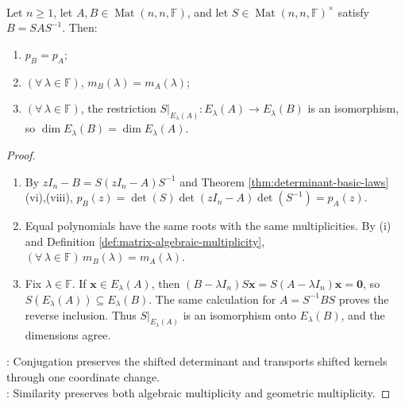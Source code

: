 \begin{theorem} \label{thm:similarity-preserves-characteristic-polynomial} \\
Let $n\geq1$, let $A,B\in\operatorname{Mat}(n,n,\mathbb{F})$, and let $S\in\operatorname{Mat}(n,n,\mathbb{F})^{\times}$ satisfy $B=SAS^{-1}$. Then:
\begin{enumerate}[label=(\roman*)]
\setlength{\itemsep}{0pt}
\item $p_B=p_A$;
\item $(\forall\,\lambda\in\mathbb{F})$, $m_B(\lambda)=m_A(\lambda)$;
\item $(\forall\,\lambda\in\mathbb{F})$, the restriction $S|_{E_{\lambda}(A)}:E_{\lambda}(A)\to E_{\lambda}(B)$ is an isomorphism, so $\dim E_{\lambda}(B)=\dim E_{\lambda}(A)$.
\end{enumerate}
\begin{proof}
\begin{enumerate}[label=(\roman*)]
\setlength{\itemsep}{0pt}
\item By $zI_n-B=S(zI_n-A)S^{-1}$ and Theorem \ref{thm:determinant-basic-laws}(vi),(viii), $p_B(z)=\det(S)\det(zI_n-A)\det(S^{-1})=p_A(z)$.
\item Equal polynomials have the same roots with the same multiplicities. By (i) and Definition \ref{def:matrix-algebraic-multiplicity}, $(\forall\,\lambda\in\mathbb{F})\,m_B(\lambda)=m_A(\lambda)$.
\item Fix $\lambda\in\mathbb{F}$. If $\mathbf{x}\in E_{\lambda}(A)$, then $(B-\lambda I_n)S\mathbf{x}=S(A-\lambda I_n)\mathbf{x}=\mathbf{0}$, so $S(E_{\lambda}(A))\subseteq E_{\lambda}(B)$. The same calculation for $A=S^{-1}BS$ proves the reverse inclusion. Thus $S|_{E_{\lambda}(A)}$ is an isomorphism onto $E_{\lambda}(B)$, and the dimensions agree.
\end{enumerate}
: Conjugation preserves the shifted determinant and transports shifted kernels through one coordinate change.\\
: Similarity preserves both algebraic multiplicity and geometric multiplicity.
\end{proof}
\end{theorem}

